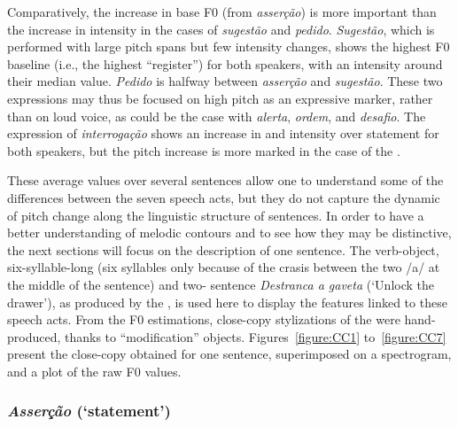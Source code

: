 \documentclass[output=paper]{LSP/langsci}
\begin{document}
Comparatively, the increase in base F0 (from \textit{asserção}) is more important than the increase in intensity in the cases of \textit{sugestão} and \textit{pedido}. 
\textit{Sugestão}, which is performed with large pitch spans but few intensity changes, shows the highest F0 baseline (i.e., the highest ``register'') for both speakers, with an intensity around their median value. 
\textit{Pedido} is halfway between \textit{asserção} and \textit{sugestão}. 
These two expressions may thus be focused on high pitch as an expressive marker, rather than on loud voice, as could be the case with \textit{alerta}, \textit{ordem}, and \textit{desafio}. 
The expression of \textit{interrogação} shows an increase in  and intensity over statement for both speakers, but the pitch increase is more marked in the case of the .

These average values over several sentences allow one to understand some of the differences between the seven speech acts, but they do not capture the dynamic of pitch change along the linguistic structure of sentences. 
In order to have a better understanding of melodic contours and to see how they may be distinctive, the next sections will focus on the description of one sentence. 
The verb-object, six-syllable-long (six syllables only because of the crasis between the two /a/ at the middle of the sentence) and two- sentence \textit{Destranca a gaveta} (`Unlock the drawer'), as produced by the , is used here to display the  features linked to these speech acts. 
From the F0 estimations, close-copy stylizations of the  \citep{hart1991jasa} were hand-produced, thanks to  ``modification'' objects. 
Figures~\ref{figure:CC1} to~\ref{figure:CC7} present the close-copy obtained for one sentence, superimposed on a spectrogram, and a plot of the raw F0 values.


\subsubsection{\textit{Asserção} (`statement')}
\end{document}
